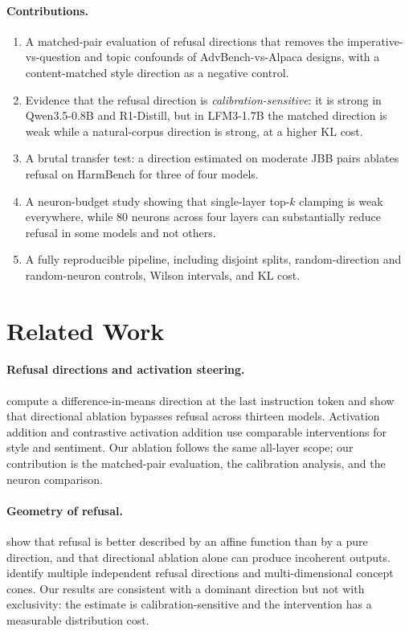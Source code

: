 \documentclass[twoside,11pt]{article}
\begin{document}
\paragraph{Contributions.}
\begin{enumerate}[leftmargin=1.4em,itemsep=2pt,topsep=2pt]
\item A matched-pair evaluation of refusal directions that removes the
imperative-vs-question and topic confounds of AdvBench-vs-Alpaca designs, with a
content-matched style direction as a negative control.
\item Evidence that the refusal direction is \emph{calibration-sensitive}: it is
strong in Qwen3.5-0.8B and R1-Distill, but in LFM3-1.7B the matched direction is
weak while a natural-corpus direction is strong, at a higher KL cost.
\item A brutal transfer test: a direction estimated on moderate JBB pairs ablates
refusal on HarmBench for three of four models.
\item A neuron-budget study showing that single-layer top-$k$ clamping is weak
everywhere, while 80 neurons across four layers can substantially reduce refusal in
some models and not others.
\item A fully reproducible pipeline, including disjoint splits, random-direction
and random-neuron controls, Wilson intervals, and KL cost.
\end{enumerate}

\section{Related Work}

\paragraph{Refusal directions and activation steering.}
\citet{arditi2024refusal} compute a difference-in-means direction at the last
instruction token and show that directional ablation bypasses refusal across
thirteen models. Activation addition \citep{turner2023activation} and contrastive
activation addition \citep{panickssery2023steering} use comparable interventions for
style and sentiment. Our ablation follows the same all-layer scope; our contribution
is the matched-pair evaluation, the calibration analysis, and the neuron comparison.

\paragraph{Geometry of refusal.}
\citet{marshall2024affine} show that refusal is better described by an affine
function than by a pure direction, and that directional ablation alone can produce
incoherent outputs. \citet{wollschlager2025cones} identify multiple independent
refusal directions and multi-dimensional concept cones. Our results are consistent
with a dominant direction but not with exclusivity: the estimate is
calibration-sensitive and the intervention has a measurable distribution cost.
\end{document}
